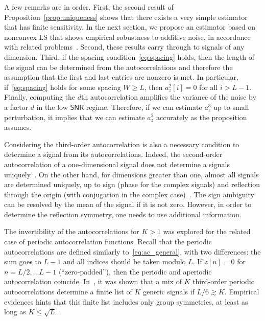 \documentclass[english,11pt]{article}
\newcommand{\TODO}[1]{{\color{red}{[#1]}}}
\numberwithin{equation}{section}
\theoremstyle{plain}
\theoremstyle{definition}
\theoremstyle{remark}
\theoremstyle{plain}
\theoremstyle{remark}
\theoremstyle{plain}
\theoremstyle{plain}
\newcommand{\SNR}{{\textsf{SNR}}}
\begin{document}
A few remarks are in order. 
First, the second result of Proposition~\ref{prop:uniqueness} shows that there exists a very simple estimator that has finite sensitivity. In the next section, we propose an estimator based on nonconvex LS that shows empirical robustness to additive noise, in accordance with related problems~\cite{bendory2017bispectrum,boumal2017heterogeneous}. 
Second, these results carry through to signals of any dimension.
Third, if the spacing condition~\eqref{eq:spacing} holds, then the length of the signal can be determined from the autocorrelations and 
therefore the assumption that the first and last entries are nonzero is met. In particular, if~\eqref{eq:spacing} holds for some spacing $W\geq L$, then $a_z^2[i]=0$ for all $i>L-1$.
Finally, computing the $d$th autocorrelation amplifies the variance of the noise by a factor $d$ in the low $\SNR$ regime. Therefore, if we can estimate $a_z^3$ up to small perturbation, it implies that we can estimate $a_z^2$ accurately as the proposition assumes. 

Considering the third-order autocorrelation is also a necessary condition to determine a signal from its autocorrelations. Indeed, the second-order autocorrelation of a one-dimensional signal does not determine a signals uniquely~\cite{beinert2015ambiguities,bendory2017fourier}. On the other hand, for dimensions greater than one, almost all signals are determined uniquely, up to sign (phase for the complex signals) and reflection through the origin (with conjugation in the complex case)~\cite{hayes1982reconstruction,hayes1982reducible}. The sign ambiguity can be resolved by the mean of the signal if it is not zero. However,  in order to determine the reflection symmetry, one needs to use additional information.

\TODO{NB: I would remove most if this paragraph; we can have a similar discussion but for our case (after having discussing which moments we keep); make the statement, and finish with a one-sentence reference to the MRA paper. TB: I didn't touch it yet. We may want to put the degrees-of-freedom calculations from Section 4 here}
The invertibility of the autocorrelations for $K>1$ was explored  for the related case of  periodic autocorrelation functions. Recall that the  periodic autocorrelations are defined similarly to~\eqref{eq:ac_general}, with two differences: the sum goes to $L-1$ and all indices should be taken modulo $L$.
If $z[n]=0$ for $n=L/2,\ldots L-1$ (``zero-padded''), then the periodic and aperiodic autocorrelation coincide.
In~\cite{bandeira2017estimation}, it was shown that a mix of $K$ third-order periodic autocorrelations determine  a finite list of $K$ generic signals if $L/6\gtrsim K$. Empirical evidences hints that this finite list includes only group symmetries, at least as long as $K\leq\sqrt{L}$~\cite{boumal2017heterogeneous}. 
\end{document}

